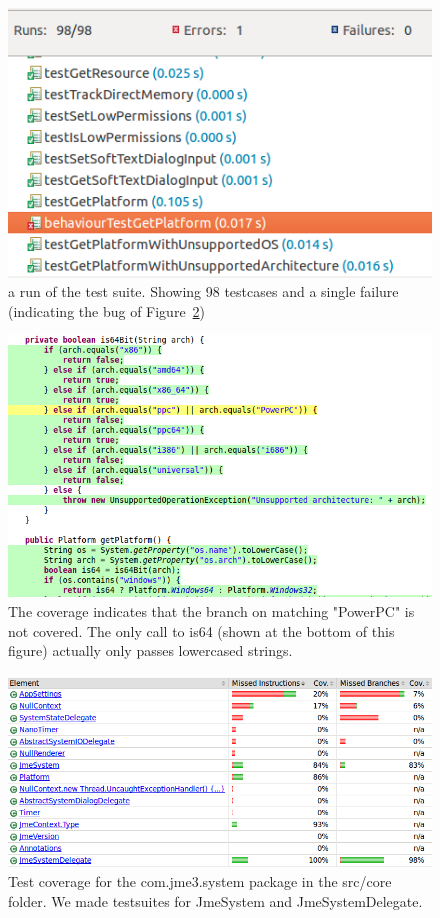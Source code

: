 \documentclass[a4paper, 10pt]{article}
\begin{document}
\begin{figure}[!hb]
\includegraphics[width=\textwidth]{figures/86-new-tests.png}
\caption{a run of the test suite. Showing 98 testcases and a single failure (indicating the bug of Figure~\ref{fig:bug})}
\label{fig:num-tests}
\end{figure}

\begin{figure}[!hb]
\includegraphics[width=\textwidth]{figures/bug-in-delegate.png}
\caption{The coverage indicates that the branch on matching "PowerPC" is not covered. The only call to is64 (shown at the bottom of this figure) actually only passes lowercased strings.}
\label{fig:bug}
\end{figure}

\begin{figure}[!hb]
\includegraphics[width=\textwidth]{figures/test-coverage-core.png}
\caption{Test coverage for the com.jme3.system package in the src/core folder. We made testsuites for JmeSystem and JmeSystemDelegate.}
\label{fig:cov-core}
\end{figure}
\end{document}
